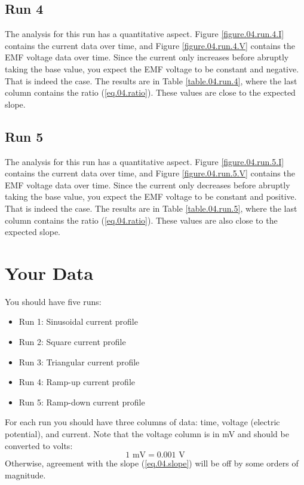 \subsection{Run 4}
%
The analysis for this run has a quantitative aspect. Figure \ref{figure.04.run.4.I} contains the current data over time, and Figure \ref{figure.04.run.4.V} contains the EMF voltage data over time. Since the current only increases before abruptly taking the base value, you expect the EMF voltage to be constant and negative. That is indeed the case. The results are in Table \ref{table.04.run.4}, where the last column contains the ratio (\ref{eq.04.ratio}). These values are close to the expected slope.
%
\subsection{Run 5}
%
The analysis for this run has a quantitative aspect. Figure \ref{figure.04.run.5.I} contains the current data over time, and Figure \ref{figure.04.run.5.V} contains the EMF voltage data over time. Since the current only decreases before abruptly taking the base value, you expect the EMF voltage to be constant and positive. That is indeed the case. The results are in Table \ref{table.04.run.5}, where the last column contains the ratio (\ref{eq.04.ratio}). These values are also close to the expected slope.
%
\section{Your Data}
%
You should have five runs:
\begin{itemize}
	\item Run 1: Sinusoidal current profile
	\item Run 2: Square current profile
	\item Run 3: Triangular current profile
	\item Run 4: Ramp-up current profile
	\item Run 5: Ramp-down current profile
\end{itemize}
For each run you should have three columns of data: time, voltage (electric potential), and current. Note that the voltage column is in mV and should be converted to volts:
\begin{equation}
	1 \text{ mV} = 0.001 \text{ V}
\end{equation}
Otherwise, agreement with the slope (\ref{eq.04.slope}) will be off by some orders of magnitude.
%
\newpage
